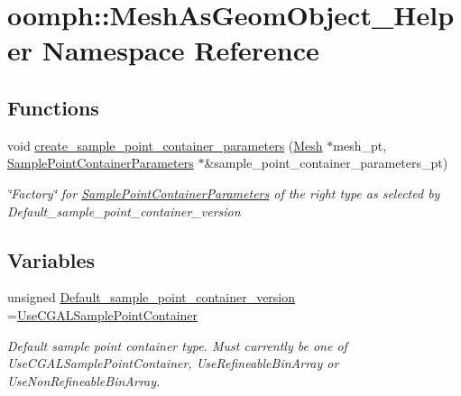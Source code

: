\hypertarget{namespaceoomph_1_1MeshAsGeomObject__Helper}{}\section{oomph\+:\+:Mesh\+As\+Geom\+Object\+\_\+\+Helper Namespace Reference}
\label{namespaceoomph_1_1MeshAsGeomObject__Helper}
\subsection*{Functions}
\begin{DoxyCompactItemize}
\item 
void \hyperlink{namespaceoomph_1_1MeshAsGeomObject__Helper_a4c01eba9e65a9757c7e18ff56cb28122}{create\+\_\+sample\+\_\+point\+\_\+container\+\_\+parameters} (\hyperlink{classoomph_1_1Mesh}{Mesh} $\ast$mesh\+\_\+pt, \hyperlink{classoomph_1_1SamplePointContainerParameters}{Sample\+Point\+Container\+Parameters} $\ast$\&sample\+\_\+point\+\_\+container\+\_\+parameters\+\_\+pt)
\begin{DoxyCompactList}\small\item\em \char`\"{}\+Factory\char`\"{} for \hyperlink{classoomph_1_1SamplePointContainerParameters}{Sample\+Point\+Container\+Parameters} of the right type as selected by Default\+\_\+sample\+\_\+point\+\_\+container\+\_\+version \end{DoxyCompactList}\end{DoxyCompactItemize}
\subsection*{Variables}
\begin{DoxyCompactItemize}
\item 
unsigned \hyperlink{namespaceoomph_1_1MeshAsGeomObject__Helper_a215c84a14b595f33f254c5e059e88958}{Default\+\_\+sample\+\_\+point\+\_\+container\+\_\+version} =\hyperlink{namespaceoomph_a8c0fdc9bd9751811cd49fe6f06c55991a75595ef05f43add7443737e4fe76cd61}{Use\+C\+G\+A\+L\+Sample\+Point\+Container}
\begin{DoxyCompactList}\small\item\em Default sample point container type. Must currently be one of Use\+C\+G\+A\+L\+Sample\+Point\+Container, Use\+Refineable\+Bin\+Array or Use\+Non\+Refineable\+Bin\+Array. \end{DoxyCompactList}\end{DoxyCompactItemize}


